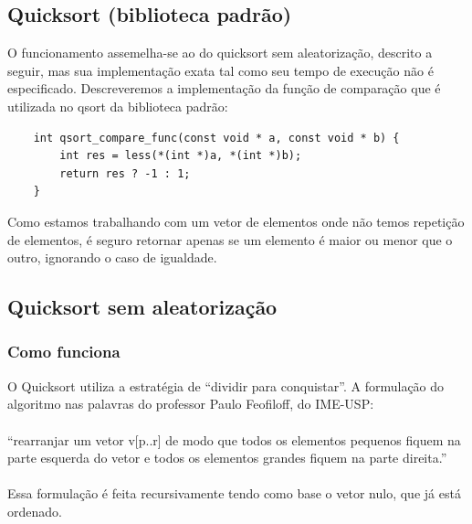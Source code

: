 \documentclass[12pt,a4paper]{article}
\begin{document}
	\subsection{Quicksort (biblioteca padrão)}
	\indent O funcionamento assemelha-se ao do quicksort sem aleatorização, descrito a seguir, mas sua implementação exata tal como seu tempo de execução não é especificado. Descreveremos a implementação da função de comparação que é utilizada no qsort da biblioteca padrão:

	\begin{minipage}{\linewidth}
	\begin{lstlisting}
	int qsort_compare_func(const void * a, const void * b) {
		int res = less(*(int *)a, *(int *)b);
		return res ? -1 : 1;
	}
	\end{lstlisting}
	\end{minipage}

	\indent Como estamos trabalhando com um vetor de elementos onde não temos repetição de elementos, é seguro retornar apenas se um elemento é maior ou menor que o outro, ignorando o caso de igualdade.



	\subsection{Quicksort sem aleatorização}

	\subsubsection{Como funciona}
	\indent O Quicksort utiliza a estratégia de “dividir para conquistar”. A formulação do algoritmo nas palavras do professor Paulo Feofiloff, do IME-USP:\\\\
	\indent \indent “rearranjar um vetor v[p..r] de modo que todos os elementos pequenos fiquem na parte esquerda do vetor e todos os elementos grandes fiquem na parte direita.”\\\\
	\indent Essa formulação é feita recursivamente tendo como base o vetor nulo, que já está ordenado.
\end{document}
